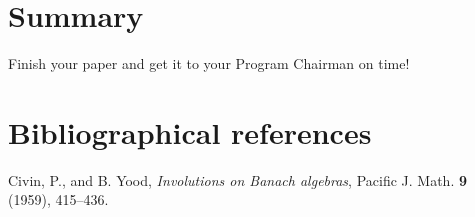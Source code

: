 \documentclass{entcs} \usepackage{entcsmacro}
\begin{document}
\section{Summary}  
\begin{problem}
  Finish your paper and get it to your Program Chairman on time!
\end{problem}

\section{Bibliographical references}\label{references}

\begin{thebibliography}{10}\label{bibliography}
 Civin, P., and B. Yood, \emph{Involutions on Banach
    algebras}, Pacific J. Math. \textbf{9} (1959), 415--436.
  
\end{thebibliography}
\end{document}
